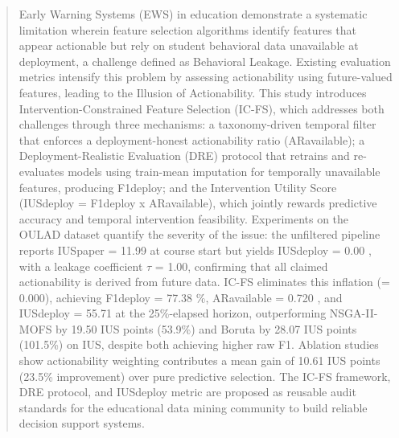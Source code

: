 \documentclass[a4paper,fleqn]{cas-sc}
\begin{document}
\author[1]{Khang Truong}






\begin{abstract}
Early Warning Systems (EWS) in education demonstrate a systematic limitation wherein feature selection algorithms identify features that appear actionable but rely on student behavioral data unavailable at deployment, a challenge defined as Behavioral Leakage. Existing evaluation metrics intensify this problem by assessing actionability using future-valued features, leading to the Illusion of Actionability. This study introduces Intervention-Constrained Feature Selection (IC-FS), which addresses both challenges through three mechanisms: a taxonomy-driven temporal filter that enforces a deployment-honest actionability ratio (ARavailable); a Deployment-Realistic Evaluation (DRE) protocol that retrains and re-evaluates models using train-mean imputation for temporally unavailable features, producing F1deploy; and the Intervention Utility Score (IUSdeploy = F1deploy x ARavailable), which jointly rewards predictive accuracy and temporal intervention feasibility. Experiments on the OULAD dataset quantify the severity of the issue: the unfiltered pipeline reports IUSpaper = 11.99  at course start but yields IUSdeploy = 0.00 , with a leakage coefficient $\tau$ = 1.00, confirming that all claimed actionability is derived from future data. IC-FS eliminates this inflation (\taurus = 0.000), achieving F1deploy = 77.38 \%, ARavailable = 0.720 , and IUSdeploy = 55.71  at the 25\%-elapsed horizon, outperforming NSGA-II-MOFS by 19.50 IUS points (53.9\%) and Boruta by 28.07 IUS points (101.5\%) on IUS, despite both achieving higher raw F1. Ablation studies show actionability weighting contributes a mean gain of 10.61 IUS points (23.5\% improvement) over pure predictive selection. The IC-FS framework, DRE protocol, and IUSdeploy metric are proposed as reusable audit standards for the educational data mining community to build reliable decision support systems.
\end{abstract}
\end{document}
